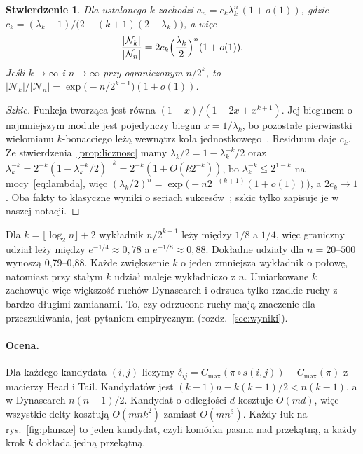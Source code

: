 \documentclass[letterpaper]{article} %
\newtheorem{proposition}{Stwierdzenie}
\theoremstyle{definition}
\newcommand{\N}{\mathcal{N}}
\begin{document}
\begin{proposition}\label{prop:udzial}
Dla ustalonego $k$ zachodzi $a_n=c_k\lambda_k^n\,(1+o(1))$, gdzie
$c_k=(\lambda_k-1)/\bigl(2-(k+1)(2-\lambda_k)\bigr)$, a więc
\begin{equation}\label{eq:udzial}
\frac{|\N_k|}{|\N_n|}=2c_k\Bigl(\frac{\lambda_k}{2}\Bigr)^{n}(1+o(1)).
\end{equation}
Jeśli $k\to\infty$ i $n\to\infty$ przy ograniczonym $n/2^k$, to
$|\N_k|/|\N_n|=\exp\bigl(-n/2^{k+1}\bigr)(1+o(1))$.
\end{proposition}
\begin{proof}[Szkic]
Funkcja tworząca jest równa $(1-x)/(1-2x+x^{k+1})$. Jej biegunem
o najmniejszym module jest pojedynczy biegun $x=1/\lambda_k$, bo
pozostałe pierwiastki wielomianu $k$-bonacciego leżą wewnątrz koła
jednostkowego~\cite{miles1960}. Residuum daje $c_k$. Ze
stwierdzenia~\ref{prop:licznosc} mamy $\lambda_k/2=1-\lambda_k^{-k}/2$
oraz $\lambda_k^{-k}=2^{-k}(1-\lambda_k^{-k}/2)^{-k}=2^{-k}(1+O(k2^{-k}))$,
bo $\lambda_k^{-k}\leq 2^{1-k}$ na mocy~\eqref{eq:lambda},
więc $(\lambda_k/2)^n=\exp\bigl(-n2^{-(k+1)}(1+o(1))\bigr)$,
a $2c_k\to 1$.
Oba fakty to klasyczne wyniki o seriach
sukcesów~\cite{feller1968,gordon1986}; szkic tylko zapisuje je w naszej
notacji.
\end{proof}

Dla $k=\lfloor\log_2 n\rfloor+2$ wykładnik $n/2^{k+1}$ leży między $1/8$
a $1/4$, więc graniczny udział leży między $e^{-1/4}\approx 0{,}78$
a $e^{-1/8}\approx 0{,}88$. Dokładne udziały dla $n=20$--$500$ wynoszą
0,79--0,88. Każde zwiększenie $k$ o jeden zmniejsza wykładnik o połowę,
natomiast przy stałym $k$ udział maleje wykładniczo z $n$. Umiarkowane $k$
zachowuje więc większość ruchów Dynasearch i odrzuca tylko rzadkie ruchy
z bardzo długimi zamianami. To, czy odrzucone ruchy mają znaczenie dla
przeszukiwania, jest pytaniem empirycznym (rozdz.~\ref{sec:wyniki}).


\paragraph{Ocena.} Dla każdego kandydata $(i,j)$ liczymy
$\delta_{ij}=C_{\max}(\pi\circ s(i,j))-C_{\max}(\pi)$ z macierzy Head
i Tail. Kandydatów jest $(k-1)n-k(k-1)/2<n(k-1)$, a w Dynasearch
$n(n-1)/2$. Kandydat o odległości $d$ kosztuje $O(md)$, więc wszystkie
delty kosztują $O(mnk^2)$ zamiast $O(mn^3)$. Każdy łuk na rys.~\ref{fig:plansze} to jeden kandydat, czyli komórka
pasma nad przekątną, a każdy krok $k$ dokłada jedną przekątną.
\end{document}
